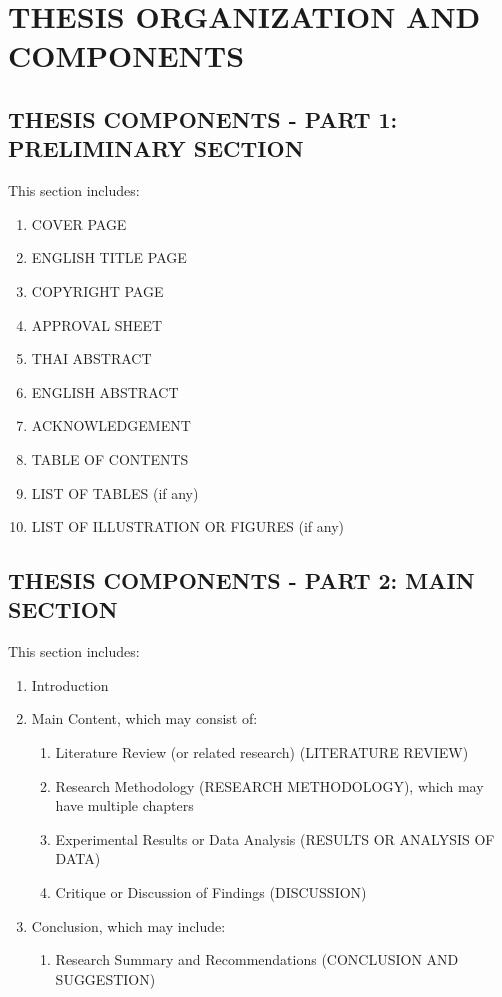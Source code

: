 \chapter{THESIS ORGANIZATION AND COMPONENTS}

\section{THESIS COMPONENTS - PART 1: PRELIMINARY SECTION}

This section includes:
\begin{enumerate}
    \item COVER PAGE
    \item ENGLISH TITLE PAGE
    \item COPYRIGHT PAGE
    \item APPROVAL SHEET
    \item THAI ABSTRACT
    \item ENGLISH ABSTRACT
    \item ACKNOWLEDGEMENT
    \item TABLE OF CONTENTS
    \item LIST OF TABLES (if any)
    \item LIST OF ILLUSTRATION OR FIGURES (if any)
\end{enumerate}

\section{THESIS COMPONENTS - PART 2: MAIN SECTION}

This section includes:
\begin{enumerate}
    \item Introduction
    \item Main Content, which may consist of:
    \begin{enumerate}[label=2.\arabic*]
        \item Literature Review (or related research) (LITERATURE REVIEW)
        \item Research Methodology (RESEARCH METHODOLOGY), which may have multiple chapters
        \item Experimental Results or Data Analysis (RESULTS OR ANALYSIS OF DATA)
        \item Critique or Discussion of Findings (DISCUSSION)
    \end{enumerate}
    \item Conclusion, which may include:
    \begin{enumerate}[label=3.\arabic*]
        \item Research Summary and Recommendations (CONCLUSION AND SUGGESTION)
    \end{enumerate}
\end{enumerate}

